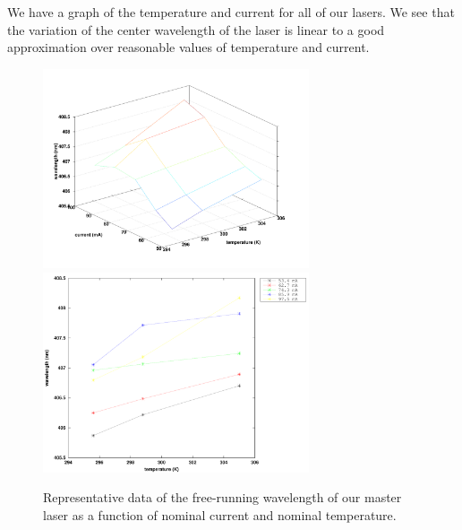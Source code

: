 We have a graph of the temperature and current for all of our lasers. We see that the variation of the center wavelength of the laser is linear to a good approximation over reasonable values of temperature and current.

\begin{figure}
\centering
\includegraphics[width=0.7\textwidth]{TVlambda3} 
\includegraphics[width=0.7\textwidth]{TVlambda2}
\caption[Graph of Temperatures and Currents]{\label{3dCurrentandTgraph} Representative data of the free-running wavelength of our master laser as a function of nominal current and nominal temperature.}
\end{figure}
